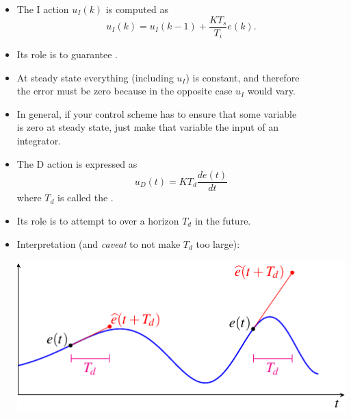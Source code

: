\begin{frame}
\framesubtitleTC{}
\myPause
 \begin{itemize}[<+-| alert@+>]
 \item The I action $u_I(k)$ is computed as
       \begin{displaymath}
        u_I(k) = u_I(k-1) + \frac{KT_s}{T_i} e(k).
       \end{displaymath}
 \item Its role is to guarantee .
 \item At steady state everything (including $u_I$) is constant, and therefore\\
       the error must be zero because in the opposite case $u_I$ would vary.
 \item In general, if your control scheme has to ensure that some variable\\
       is zero at steady state, just make that variable the input of an\\
       integrator. 
 \end{itemize}
\end{frame}

\begin{frame}
\framesubtitleTC{}
\myPause
 \begin{itemize}[<+-| alert@+>]
 \item The D action  is expressed as
       \begin{displaymath}
        u_D(t) = K T_d \frac{de(t)}{dt}
       \end{displaymath}
       where $T_d$ is called the .
 \item Its role is to attempt to  over a horizon $T_d$ in the future.
 \item Interpretation (and \emph{caveat} to not make $T_d$ too large):
       \begin{center}
        \includegraphics[width=0.45\columnwidth]{./Unit-06/img/D-action-interpretation.pdf}
       \end{center}
 \end{itemize}
\end{frame}

